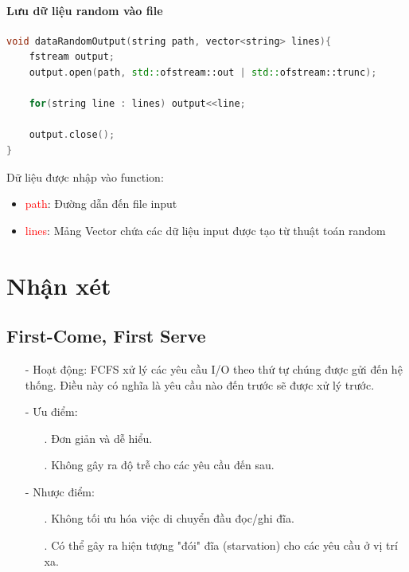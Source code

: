 \documentclass{report}
\begin{document}
            \subsubsection{Lưu dữ liệu random vào file}
                \begin{lstlisting}[language=C++, caption = Tạo dữ liệu random]
void dataRandomOutput(string path, vector<string> lines){
    fstream output;
    output.open(path, std::ofstream::out | std::ofstream::trunc);

    for(string line : lines) output<<line;

    output.close();
}
                \end{lstlisting}

                 Dữ liệu được nhập vào function:
                \begin{itemize}
                    \item \textcolor{red}{path}: Đường dẫn đến file input
                    \item \textcolor{red}{lines}: Mảng Vector chứa các dữ liệu input được tạo từ thuật toán random
                    
                \end{itemize}
\chapter{Nhận xét}
    \section{First-Come, First Serve}
        \begin{enumerate}
            \item[-] Hoạt động: FCFS xử lý các yêu cầu I/O theo thứ tự chúng được gửi đến hệ thống. Điều này có nghĩa là yêu cầu nào đến trước sẽ được xử lý trước.

            \item[-] Ưu điểm:
                \begin{enumerate}
                    \item[.] Đơn giản và dễ hiểu.
                    \item[.] Không gây ra độ trễ cho các yêu cầu đến sau.
                \end{enumerate}
            \item[-] Nhược điểm:
                \begin{enumerate}
                    \item[.] Không tối ưu hóa việc di chuyển đầu đọc/ghi đĩa.
                    \item[.] Có thể gây ra hiện tượng "đói" đĩa (starvation) cho các yêu cầu ở vị trí xa.
                \end{enumerate} 
        \end{enumerate}
\end{document}
